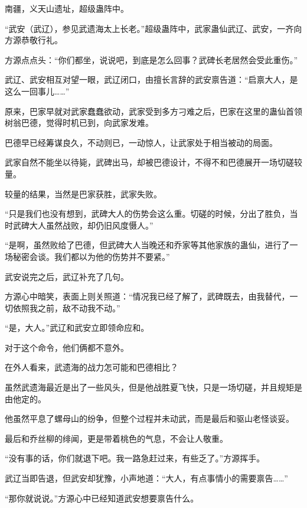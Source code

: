
\begin{this_body}



南疆，义天山遗址，超级蛊阵中。

“武安（武辽），参见武遗海太上长老。”超级蛊阵中，武家蛊仙武辽、武安，一齐向方源恭敬行礼。

方源点点头：“你们都坐，说说吧，到底是怎么回事？武碑长老居然会受此重伤。”

武辽、武安相互对望一眼，武辽闭口，由擅长言辞的武安禀告道：“启禀大人，是这么一回事儿……”

原来，巴家早就对武家蠢蠢欲动，武家受到多方刁难之后，巴家在这里的蛊仙首领树翁巴德，觉得时机已到，向武家发难。

巴德早已经筹谋良久，不动则已，一动惊人，让武家处于相当被动的局面。

武家自然不能坐以待毙，武碑出马，却被巴德设计，不得不和巴德展开一场切磋较量。

较量的结果，当然是巴家获胜，武家失败。

“只是我们也没有想到，武碑大人的伤势会这么重。切磋的时候，分出了胜负，当时武碑大人虽然战败，却仍旧风度慑人。”

“是啊，虽然败给了巴德，但武碑大人当晚还和乔家等其他家族的蛊仙，进行了一场秘密会谈。我们都以为他的伤势并不要紧。”

武安说完之后，武辽补充了几句。

方源心中暗笑，表面上则关照道：“情况我已经了解了，武碑既去，由我替代，一切依照我之前，敌不动我不动。”

“是，大人。”武辽和武安立即领命应和。

对于这个命令，他们俩都不意外。

在外人看来，武遗海的战力怎可能和巴德相比？

虽然武遗海最近是出了一些风头，但是他战胜夏飞快，只是一场切磋，并且规矩是由他定的。

他虽然平息了螺母山的纷争，但整个过程并未动武，而是最后和驱山老怪谈妥。

最后和乔丝柳的绯闻，更是带着桃色的气息，不会让人敬重。

“没有事的话，你们就退下吧。我一路急赶过来，有些乏了。”方源挥手。

武辽当即告退，但武安却犹豫，小声地道：“大人，有点事情小的需要禀告……”

“那你就说说。”方源心中已经知道武安想要禀告什么。


\end{this_body}
